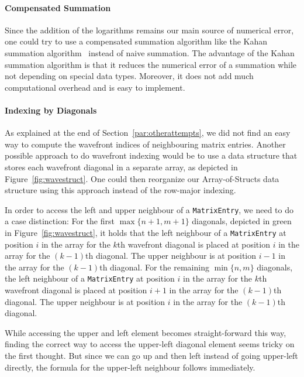 \documentclass{article}
\begin{document}
\paragraph{Compensated Summation}
Since the addition of the logarithms remains our main source of numerical error, one could try to use a compensated summation algorithm like the Kahan summation algorithm~\cite{Kahan} instead of naive summation. The advantage of the Kahan summation algorithm is that it reduces the numerical error of a summation while not depending on special data types. Moreover, it does not add much computational overhead and is easy to implement.

\paragraph{Indexing by Diagonals}
As explained at the end of Section~\ref{par:otherattempts}, we did not find an easy way to compute the wavefront indices of neighbouring matrix entries. Another possible approach to do wavefront indexing would be to use a data structure that stores each wavefront diagonal in a separate array, as depicted in Figure~\ref{fig:wavestruct}. One could then reorganize our Array-of-Structs data structure using this approach instead of the row-major indexing.

In order to access the left and upper neighbour of a \texttt{MatrixEntry}, we need to do a case distinction: For the first $\max\{n+1,m+1\}$ diagonals, depicted in green in Figure~\ref{fig:wavestruct}, it holds that the left neighbour of a \texttt{MatrixEntry} at position $i$ in the array for the $k$th wavefront diagonal is placed at position $i$ in the array for the $(k-1)$th diagonal. The upper neighbour is at position $i-1$ in the array for the $(k-1)$th diagonal.
For the remaining $\min\{n,m\}$ diagonals, the left neighbour of a \texttt{MatrixEntry} at position $i$ in the array for the $k$th wavefront diagonal is placed at position $i+1$ in the array for the $(k-1)$th diagonal. The upper neighbour is at position $i$ in the array for the $(k-1)$th diagonal.

While accessing the upper and left element becomes straight-forward this way, finding the correct way to access the upper-left diagonal element seems tricky on the first thought. But since we can go up and then left instead of going upper-left directly, the formula for the upper-left neighbour follows immediately. 
\end{document}
